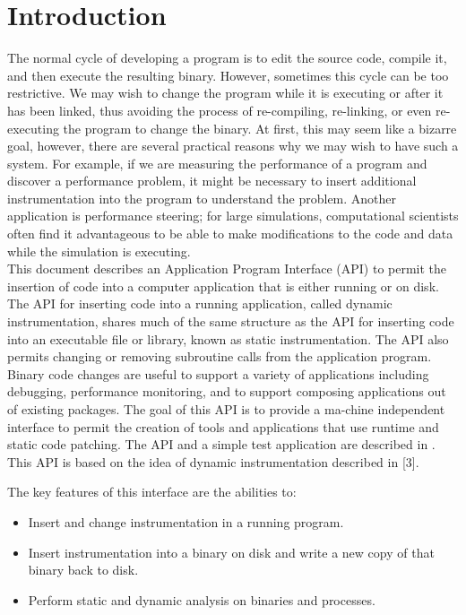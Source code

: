 \section{Introduction}\label{sec:introduction}

The normal cycle of developing a program is to edit the source code, compile it, and then execute the resulting binary.  However, sometimes this cycle can be too restrictive.  We may wish to change the program while it is executing or after it has been linked, thus avoiding the process of  re-compiling, re-linking, or even re-executing the program to change the binary.  At first, this may seem like a bizarre goal, however, there are several practical reasons why we may wish to have such a system.  For example, if we are measuring the performance of a program and discover a performance problem, it might be necessary to insert additional instrumentation into the program to understand the problem.  Another application is performance steering; for large simulations, computational scientists often find it advantageous to be able to make modifications to the code and data while the simulation is executing.\\


This document describes an Application Program Interface (API) to permit the insertion of code into a computer application that is either running or on disk.  The API for inserting code into a running application, called dynamic instrumentation, shares much of the same structure as the API for inserting code into an executable file or library, known as static instrumentation.  The API also permits changing or removing subroutine calls from the application program.  Binary code changes are useful to support a variety of applications including debugging, performance monitoring, and to support composing applications out of existing packages.  The goal of this API is to provide a ma-chine independent interface to permit the creation of tools and applications that use runtime and static code patching.  The API and a simple test application are described in \cite{api-code-patching}.  This API is based on the idea of dynamic instrumentation described in [3].

The key features of this interface are the abilities to:
\begin{itemize}
	\item 	Insert and change instrumentation in a running program.
	\item Insert instrumentation into a binary on disk and write a new copy of that binary back to disk.
	\item Perform static and dynamic analysis on binaries and processes.
\end{itemize}


